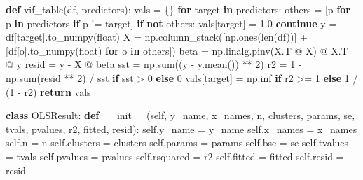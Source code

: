 \documentclass[
  letterpaper,
  DIV=11,
  numbers=noendperiod]{scrartcl}
\newenvironment{Shaded}{\begin{snugshade}}{\end{snugshade}}
\newcommand{\BuiltInTok}[1]{\textcolor[rgb]{0.00,0.23,0.31}{#1}}
\newcommand{\ControlFlowTok}[1]{\textcolor[rgb]{0.00,0.23,0.31}{\textbf{#1}}}
\newcommand{\DecValTok}[1]{\textcolor[rgb]{0.68,0.00,0.00}{#1}}
\newcommand{\FloatTok}[1]{\textcolor[rgb]{0.68,0.00,0.00}{#1}}
\newcommand{\FunctionTok}[1]{\textcolor[rgb]{0.28,0.35,0.67}{#1}}
\newcommand{\KeywordTok}[1]{\textcolor[rgb]{0.00,0.23,0.31}{\textbf{#1}}}
\newcommand{\NormalTok}[1]{\textcolor[rgb]{0.00,0.23,0.31}{#1}}
\newcommand{\OperatorTok}[1]{\textcolor[rgb]{0.37,0.37,0.37}{#1}}
\newcommand{\VariableTok}[1]{\textcolor[rgb]{0.07,0.07,0.07}{#1}}
\begin{document}
\begin{Shaded}
\begin{Highlighting}[]
\KeywordTok{def}\NormalTok{ vif\_table(df, predictors):}
\NormalTok{    vals }\OperatorTok{=}\NormalTok{ \{\}}
    \ControlFlowTok{for}\NormalTok{ target }\KeywordTok{in}\NormalTok{ predictors:}
\NormalTok{        others }\OperatorTok{=}\NormalTok{ [p }\ControlFlowTok{for}\NormalTok{ p }\KeywordTok{in}\NormalTok{ predictors }\ControlFlowTok{if}\NormalTok{ p }\OperatorTok{!=}\NormalTok{ target]}
        \ControlFlowTok{if} \KeywordTok{not}\NormalTok{ others:}
\NormalTok{            vals[target] }\OperatorTok{=} \FloatTok{1.0}
            \ControlFlowTok{continue}
\NormalTok{        y }\OperatorTok{=}\NormalTok{ df[target].to\_numpy(}\BuiltInTok{float}\NormalTok{)}
\NormalTok{        X }\OperatorTok{=}\NormalTok{ np.column\_stack([np.ones(}\BuiltInTok{len}\NormalTok{(df))] }\OperatorTok{+}\NormalTok{ [df[o].to\_numpy(}\BuiltInTok{float}\NormalTok{) }\ControlFlowTok{for}\NormalTok{ o }\KeywordTok{in}\NormalTok{ others])}
\NormalTok{        beta }\OperatorTok{=}\NormalTok{ np.linalg.pinv(X.T }\OperatorTok{@}\NormalTok{ X) }\OperatorTok{@}\NormalTok{ X.T }\OperatorTok{@}\NormalTok{ y}
\NormalTok{        resid }\OperatorTok{=}\NormalTok{ y }\OperatorTok{{-}}\NormalTok{ X }\OperatorTok{@}\NormalTok{ beta}
\NormalTok{        sst }\OperatorTok{=}\NormalTok{ np.}\BuiltInTok{sum}\NormalTok{((y }\OperatorTok{{-}}\NormalTok{ y.mean()) }\OperatorTok{**} \DecValTok{2}\NormalTok{)}
\NormalTok{        r2 }\OperatorTok{=} \DecValTok{1} \OperatorTok{{-}}\NormalTok{ np.}\BuiltInTok{sum}\NormalTok{(resid }\OperatorTok{**} \DecValTok{2}\NormalTok{) }\OperatorTok{/}\NormalTok{ sst }\ControlFlowTok{if}\NormalTok{ sst }\OperatorTok{\textgreater{}} \DecValTok{0} \ControlFlowTok{else} \DecValTok{0}
\NormalTok{        vals[target] }\OperatorTok{=}\NormalTok{ np.inf }\ControlFlowTok{if}\NormalTok{ r2 }\OperatorTok{\textgreater{}=} \DecValTok{1} \ControlFlowTok{else} \DecValTok{1} \OperatorTok{/}\NormalTok{ (}\DecValTok{1} \OperatorTok{{-}}\NormalTok{ r2)}
    \ControlFlowTok{return}\NormalTok{ vals}

\KeywordTok{class}\NormalTok{ OLSResult:}
    \KeywordTok{def} \FunctionTok{\_\_init\_\_}\NormalTok{(}\VariableTok{self}\NormalTok{, y\_name, x\_names, n, clusters, params, se, tvals, pvalues, r2, fitted, resid):}
        \VariableTok{self}\NormalTok{.y\_name }\OperatorTok{=}\NormalTok{ y\_name}
        \VariableTok{self}\NormalTok{.x\_names }\OperatorTok{=}\NormalTok{ x\_names}
        \VariableTok{self}\NormalTok{.n }\OperatorTok{=}\NormalTok{ n}
        \VariableTok{self}\NormalTok{.clusters }\OperatorTok{=}\NormalTok{ clusters}
        \VariableTok{self}\NormalTok{.params }\OperatorTok{=}\NormalTok{ params}
        \VariableTok{self}\NormalTok{.bse }\OperatorTok{=}\NormalTok{ se}
        \VariableTok{self}\NormalTok{.tvalues }\OperatorTok{=}\NormalTok{ tvals}
        \VariableTok{self}\NormalTok{.pvalues }\OperatorTok{=}\NormalTok{ pvalues}
        \VariableTok{self}\NormalTok{.rsquared }\OperatorTok{=}\NormalTok{ r2}
        \VariableTok{self}\NormalTok{.fitted }\OperatorTok{=}\NormalTok{ fitted}
        \VariableTok{self}\NormalTok{.resid }\OperatorTok{=}\NormalTok{ resid}


\end{Highlighting}
\end{Shaded}
\end{document}
